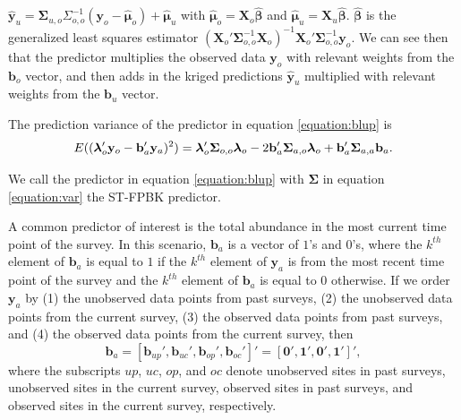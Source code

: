 \documentclass[smallextended]{svjour3}       %
\begin{document}
\(\mathbf{\hat{y}}_{u} = \bm{\Sigma}_{u, o} \Sigma_{o, o}^{-1} (\mathbf{y}_o - \bm{\hat{\mu}}_o) + \bm{\hat{\mu}}_u\)
with \(\bm{\hat{\mu}}_o = \mathbf{X}_o \bm{\hat{\beta}}\) and
\(\bm{\hat{\mu}}_u = \mathbf{X}_u \bm{\hat{\beta}}\).
\(\bm{\hat{\beta}}\) is the generalized least squares estimator
\((\mathbf{X}_o' \bm{\Sigma}_{o, o}^{-1} \mathbf{X}_o)^{-1} \mathbf{X}_o' \bm{\Sigma}_{o, o}^{-1} \mathbf{y}_o\).
We can see then that the predictor multiplies the observed data
\(\mathbf{y}_o\) with relevant weights from the \(\mathbf{b}_o\) vector,
and then adds in the kriged predictions \(\mathbf{\hat{y}}_{u}\)
multiplied with relevant weights from the \(\mathbf{b}_u\) vector.

The prediction variance of the predictor in equation \ref{equation:blup}
is \mbox{} \begin{equation} \label{equation:predvar}
E((\bm{\lambda}_o'\mathbf{y}_o - \mathbf{b}_a'\mathbf{y}_a)^2) = \\
\bm{\lambda}_o'\bm{\Sigma}_{o, o}\bm{\lambda}_o - 2 \mathbf{b}_a' \bm{\Sigma}_{a, o} \bm{\lambda}_o + \mathbf{b}_a' \bm{\Sigma}_{a, a} \mathbf{b}_a.
\end{equation}

\noindent We call the predictor in equation \ref{equation:blup} with
\(\bm{\Sigma}\) in equation \ref{equation:var} the ST-FPBK predictor.

A common predictor of interest is the total abundance in the most
current time point of the survey. In this scenario, \(\mathbf{b}_a\) is
a vector of \(1\)'s and \(0\)'s, where the \(k^{th}\) element of
\(\mathbf{b}_a\) is equal to \(1\) if the \(k^{th}\) element of
\(\mathbf{y}_a\) is from the most recent time point of the survey and
the \(k^{th}\) element of \(\mathbf{b}_a\) is equal to 0 otherwise. If
we order \(\mathbf{y}_a\) by (1) the unobserved data points from past
surveys, (2) the unobserved data points from the current survey, (3) the
observed data points from past surveys, and (4) the observed data points
from the current survey, then \mbox{}
\begin{equation} \label{equation:currentweights}
\mathbf{b}_a = [\mathbf{b}_{up}', \mathbf{b}_{uc}', \mathbf{b}_{op}', \mathbf{b}_{oc}']' = [\mathbf{0}', \mathbf{1}', \mathbf{0}', \mathbf{1}']',
\end{equation} \noindent where the subscripts \(up\), \(uc\), \(op\),
and \(oc\) denote unobserved sites in past surveys, unobserved sites in
the current survey, observed sites in past surveys, and observed sites
in the current survey, respectively.
\end{document}

